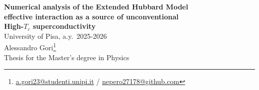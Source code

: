 \documentclass[a4paper]{article}
\begin{document}
\begin{center}
    {\bfseries {\Large Numerical analysis of the Extended Hubbard Model}} \\[0.8em]
    {\bfseries {\Large effective interaction as a source of unconventional}}\\[0.8em]
    {\bfseries {\Large High-$T_c$ superconductivity}} \\[1em]
    \large University of Pisa, a.y.~2025-2026 \\[0.8em]
    Alessandro Gori\footnote{\href{mailto:a.gori23@studenti.unipi.it}{a.gori23@studenti.unipi.it} / \href{https://github.com/nepero27178}{nepero27178@github.com}} \\[0.8em]
    \scriptsize Thesis for the Master's degree in Physics
    
\end{center}

\renewcommand*{\thefootnote}{\arabic{footnote}}
\setcounter{footnote}{0}

\begin{abstract}
    \todo
\end{abstract}

\tableofcontents

\clearpage

\printbibliography \nocite{*}
\end{document}
